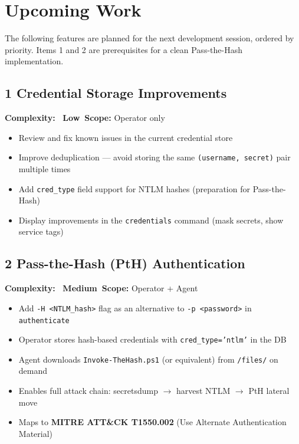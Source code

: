 \documentclass[11pt,a4paper]{article}
\newcommand{\pilllow}{\colorbox{bggreen}{\color{green}\bfseries\tiny\ Low\ }}
\newcommand{\pillmedium}{\colorbox{bgyellow}{\color{yellow}\bfseries\tiny\ Medium\ }}
\begin{document}
\section{Upcoming Work}

\begin{tcolorbox}[warnbox]
The following features are planned for the next development session, ordered by priority. Items 1 and 2 are prerequisites for a clean Pass-the-Hash implementation.
\end{tcolorbox}

\vspace{6pt}

\subsection{1 \quad Credential Storage Improvements}

\textbf{Complexity:} \pilllow \quad \textbf{Scope:} Operator only

\begin{itemize}[leftmargin=16pt, itemsep=2pt]
    \item Review and fix known issues in the current credential store
    \item Improve deduplication --- avoid storing the same \texttt{(username, secret)} pair multiple times
    \item Add \texttt{cred\_type} field support for NTLM hashes (preparation for Pass-the-Hash)
    \item Display improvements in the \texttt{credentials} command (mask secrets, show service tags)
\end{itemize}

\subsection{2 \quad Pass-the-Hash (PtH) Authentication}

\textbf{Complexity:} \pillmedium \quad \textbf{Scope:} Operator + Agent

\begin{itemize}[leftmargin=16pt, itemsep=2pt]
    \item Add \texttt{-H <NTLM\_hash>} flag as an alternative to \texttt{-p <password>} in \texttt{authenticate}
    \item Operator stores hash-based credentials with \texttt{cred\_type='ntlm'} in the DB
    \item Agent downloads \texttt{Invoke-TheHash.ps1} (or equivalent) from \texttt{/files/} on demand
    \item Enables full attack chain: secretsdump $\rightarrow$ harvest NTLM $\rightarrow$ PtH lateral move
    \item Maps to \textbf{MITRE ATT\&CK T1550.002} (Use Alternate Authentication Material)
\end{itemize}
\end{document}

